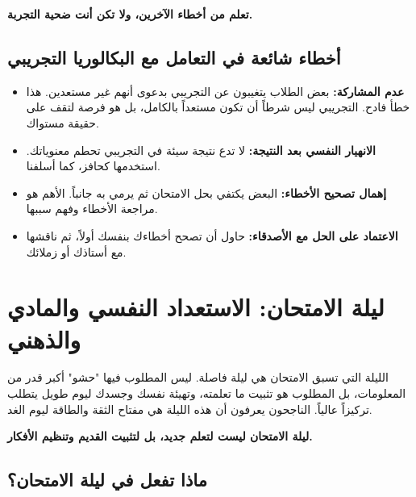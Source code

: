 \documentclass[12pt,a4paper]{book}
\newcommand{\importantAr}[1]{%
	\begin{important}
		\bfseries #1
	\end{important}
}
\begin{document}
	
	\importantAr{تعلم من أخطاء الآخرين، ولا تكن أنت ضحية التجربة.}
	
	\subsection{أخطاء شائعة في التعامل مع البكالوريا التجريبي}
	
	\begin{itemize}
		\item \textbf{عدم المشاركة:} بعض الطلاب يتغيبون عن التجريبي بدعوى أنهم غير مستعدين. هذا خطأ فادح. التجريبي ليس شرطاً أن تكون مستعداً بالكامل، بل هو فرصة لتقف على حقيقة مستواك.
		\item \textbf{الانهيار النفسي بعد النتيجة:} لا تدع نتيجة سيئة في التجريبي تحطم معنوياتك. استخدمها كحافز، كما أسلفنا.
		\item \textbf{إهمال تصحيح الأخطاء:} البعض يكتفي بحل الامتحان ثم يرمي به جانباً. الأهم هو مراجعة الأخطاء وفهم سببها.
		\item \textbf{الاعتماد على الحل مع الأصدقاء:} حاول أن تصحح أخطاءك بنفسك أولاً، ثم ناقشها مع أستاذك أو زملائك.
	\end{itemize}
	
	
	
	
\section{ليلة الامتحان: الاستعداد النفسي والمادي والذهني}

الليلة التي تسبق الامتحان هي ليلة فاصلة. ليس المطلوب فيها "حشو" أكبر قدر من المعلومات، بل المطلوب هو تثبيت ما تعلمته، وتهيئة نفسك وجسدك ليوم طويل يتطلب تركيزاً عالياً. الناجحون يعرفون أن هذه الليلة هي مفتاح الثقة والطاقة ليوم الغد.

\importantAr{ليلة الامتحان ليست لتعلم جديد، بل لتثبيت القديم وتنظيم الأفكار.}

\subsection{ماذا تفعل في ليلة الامتحان؟}
\end{document}
